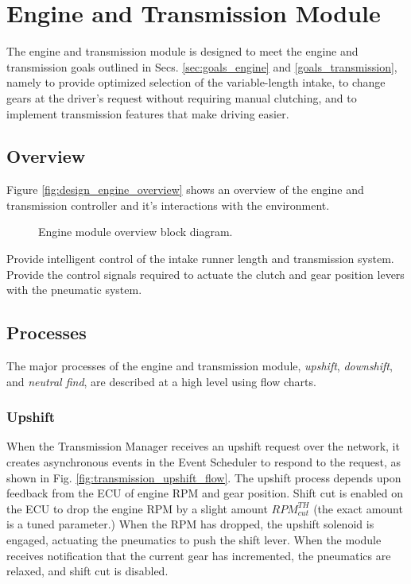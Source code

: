 \section{Engine and Transmission Module}

The engine and transmission module is designed to meet the engine and transmission goals outlined in Secs. \ref{sec:goals_engine} and \ref{goals_transmission}, namely to provide optimized selection of the variable-length intake, to change gears at the driver's request without requiring manual clutching, and to implement transmission features that make driving easier. 

\subsection{Overview}

Figure \ref{fig:design_engine_overview} shows an overview of the engine and transmission controller and it's interactions with the environment.

\begin{figure}[H]
\centering

\caption{Engine module overview block diagram.}
\label{fig:design_engine_hardware_block}
\end{figure}

Provide intelligent control of the intake runner length and transmission system.
Provide the control signals required to actuate the clutch and gear position levers with the pneumatic system.

\subsection{Processes}

The major processes of the engine and transmission module, \emph{upshift}, \emph{downshift}, and \emph{neutral find}, are described at a high level using flow charts.

\subsubsection{Upshift}

When the Transmission Manager receives an upshift request over the network, it creates asynchronous events in the Event Scheduler to respond to the request, as shown in Fig. \ref{fig:transmission_upshift_flow}. The upshift process depends upon feedback from the ECU of engine RPM and gear position. Shift cut is enabled on the ECU to drop the engine RPM by a slight amount $RPM^{TH}_{cut}$ (the exact amount is a tuned parameter.) When the RPM has dropped, the upshift solenoid is engaged, actuating the pneumatics to push the shift lever. When the module receives notification that the current gear has incremented, the pneumatics are relaxed, and shift cut is disabled.

